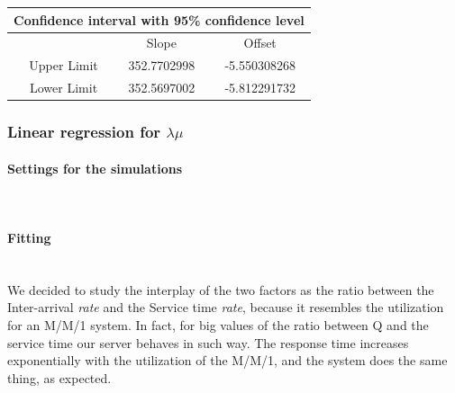 \documentclass{article}
\begin{document}
                    \begin{table}[htbp]
                        \centering 
                        \begin{tabular}{|c|c|c|}
                            
                            \hline
                            \multicolumn{3}{|c|}{\bf Confidence interval with 95\% confidence level} \\
                            
                            \hline
                            \ & Slope & Offset\\
                            \hline
                            \ Upper Limit & 352.7702998 & -5.550308268 \\ 
                            \hline
                            \ Lower Limit & 352.5697002 & -5.812291732 \\ 
                            \hline
                        \end{tabular}
                        \label{table:CI_5_fitting_mu}
                    \end{table}
                    
            \subsubsection{Linear regression for $\lambda \mu$}
                \paragraph{Settings for the simulations} \hfill \\
                    
                \paragraph{Fitting} \hfill \\
                    
                     We decided to study the interplay of the two factors as the ratio between the Inter-arrival \textit{rate} and the Service time \textit{rate},  because it resembles the utilization for an M/M/1 system. In fact, for big values of the ratio between Q and the service time our server behaves in such way. The response time increases exponentially with the utilization of the M/M/1, and the system does the same thing, as expected. 
                     
\end{document}
